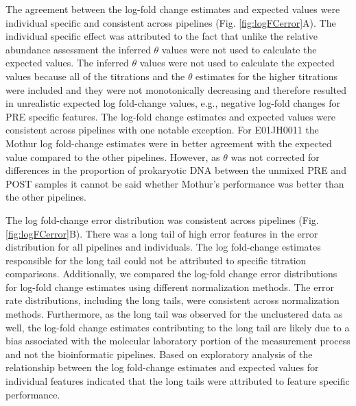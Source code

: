 \documentclass{bmcart}
\begin{document}
The agreement between the log-fold change estimates and expected values
were individual specific and consistent across pipelines (Fig.
\ref{fig:logFCerror}A). The individual specific effect was attributed to
the fact that unlike the relative abundance assessment the inferred
\(\theta\) values were not used to calculate the expected values. The
inferred \(\theta\) values were not used to calculate the expected
values because all of the titrations and the \(\theta\) estimates for
the higher titrations were included and they were not monotonically
decreasing and therefore resulted in unrealistic expected log
fold-change values, e.g., negative log-fold changes for PRE specific
features. The log-fold change estimates and expected values were
consistent across pipelines with one notable exception. For E01JH0011
the Mothur log fold-change estimates were in better agreement with the
expected value compared to the other pipelines. However, as \(\theta\)
was not corrected for differences in the proportion of prokaryotic DNA
between the unmixed PRE and POST samples it cannot be said whether
Mothur's performance was better than the other pipelines.

The log fold-change error distribution was consistent across pipelines
(Fig. \ref{fig:logFCerror}B). There was a long tail of high error
features in the error distribution for all pipelines and individuals.
The log fold-change estimates responsible for the long tail could not be
attributed to specific titration comparisons. Additionally, we compared
the log-fold change error distributions for log-fold change estimates
using different normalization methods. The error rate distributions,
including the long tails, were consistent across normalization methods.
Furthermore, as the long tail was observed for the unclustered data as
well, the log-fold change estimates contributing to the long tail are
likely due to a bias associated with the molecular laboratory portion of
the measurement process and not the bioinformatic pipelines. Based on
exploratory analysis of the relationship between the log fold-change
estimates and expected values for individual features indicated that the
long tails were attributed to feature specific performance.
\end{document}
